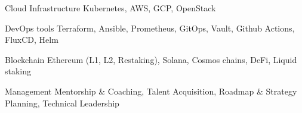   \cvskill
    {Cloud Infrastructure}
    {Kubernetes, AWS, GCP, OpenStack}

  \cvskill
    {DevOps tools}
    {Terraform, Ansible, Prometheus, GitOps, Vault, Github Actions, FluxCD, Helm}

  \cvskill
    {Blockchain}
    {Ethereum (L1, L2, Restaking), Solana, Cosmos chains, DeFi, Liquid staking}

  \cvskill
    {Management}
    {Mentorship \& Coaching, Talent Acquisition, Roadmap \& Strategy Planning, Technical Leadership}
